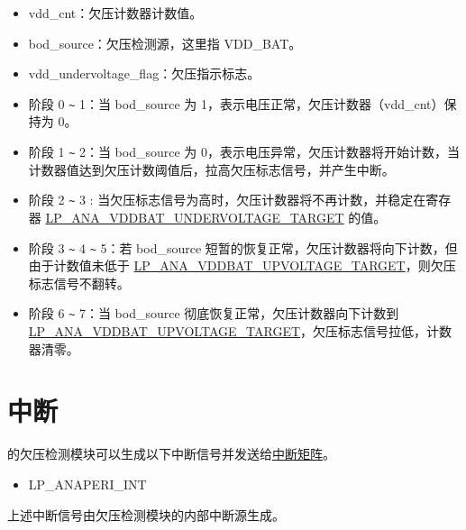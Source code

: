 \documentclass[main\_\_CN.tex]{subfiles}
\begin{document}
\begin{itemize}
      \begin{itemize}
          \item vdd\_cnt：欠压计数器计数值。
          \item bod\_source：欠压检测源，这里指 VDD\_BAT。
          \item vdd\_undervoltage\_flag：欠压指示标志。
      \end{itemize}
    \begin{itemize}
        \item 阶段 0 \verb+~+ 1：当 bod\_source 为 1，表示电压正常，欠压计数器（vdd\_cnt）保持为 0。
        \item 阶段 1 \verb+~+ 2：当 bod\_source 为 0，表示电压异常，欠压计数器将开始计数，当计数器值达到欠压计数阈值后，拉高欠压标志信号，并产生中断。
        \item 阶段 2 \verb+~+ 3 : 当欠压标志信号为高时，欠压计数器将不再计数，并稳定在寄存器 \hyperref[fielddesc:LPANAVDDBATUNDERVOLTAGETARGET]{LP\_ANA\_VDDBAT\_UNDERVOLTAGE\_TARGET} 的值。
        \item 阶段 3 \verb+~+ 4 \verb+~+ 5：若 bod\_source 短暂的恢复正常，欠压计数器将向下计数，但由于计数值未低于 \hyperref[fielddesc:LPANAVDDBATUPVOLTAGETARGET]{LP\_ANA\_VDDBAT\_UPVOLTAGE\_TARGET}，则欠压标志信号不翻转。
        \item 阶段 6 \verb+~+ 7：当 bod\_source 彻底恢复正常，欠压计数器向下计数到 \hyperref[fielddesc:LPANAVDDBATUPVOLTAGETARGET]{LP\_ANA\_VDDBAT\_UPVOLTAGE\_TARGET}，欠压标志信号拉低，计数器清零。
    \end{itemize}
\end{itemize}


\section{中断}

\chipname{} 的欠压检测模块可以生成以下中断信号并发送给\hyperref[mod:intmtrx]{中断矩阵}。

    \begin{itemize}
        \item LP\_ANAPERI\_INT
    \end{itemize}

上述中断信号由欠压检测模块的内部中断源生成。
\end{document}
